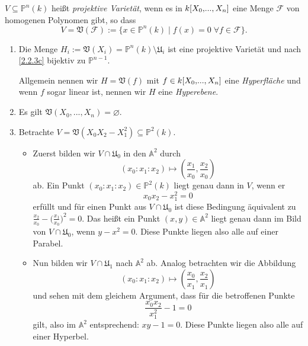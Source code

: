 \documentclass[a4paper,12pt,index=toc]{scrbook}
\theoremstyle{keinenummern} %
\def\A{\mathbb{A}}
\def\V{\mathfrak{V}}
\def\P{\mathbb{P}}
\newcommand{\F}{\mathcal{F}}
\def\U{\mathfrak{U}}
\newcommand{\leer}{\ensuremath{\varnothing}}
\renewcommand{\dotsc}{\ensuremath{\!...}}
\newcommand{\ppolyx}[1][n]{\ensuremath%
  [X_{0},\dotsc,X_{#1}]}
\begin{document}
\begin{dfn}\label{2.3.2}
$V\subseteq\P^{n}(k)$ heißt \emph{projektive Varietät}, wenn es in $k\ppolyx$ eine Menge $\F$ von homogenen Polynomen gibt, so dass
\begin{equation*}V=\V(\F):=\{x\in\P^{n}(k)\mid f(x)=0\;\forall f\in\F\}.\end{equation*}
\end{dfn}

\begin{bsp}\label{2.3.3}\begin{enumerate}
\item Die Menge $H_{i}:=\V(X_{i})=\P^{n}(k)\setminus \U_{i}$ ist eine projektive Varietät und nach \cref{2.2.3c} bijektiv zu $\P^{n-1}$.

Allgemein nennen wir $H=\V(f)$ mit $f\in k\ppolyx$ eine \emph{Hyperfläche} und wenn $f$ sogar linear ist, nennen wir $H$ eine \emph{Hyperebene}.
\item Es gilt $\V(X_{0},\dotsc,X_{n})=\leer$.
\item Betrachte $V=\V(X_{0}X_{2}-X_{1}^{2})\subseteq\P^{2}(k)$.
\begin{itemize}
\item Zuerst bilden wir $V\cap \U_{0}$ in den $\A^{2}$ durch
\begin{equation*}(x_{0}:x_{1}:x_{2})\mapsto\left(\frac{x_{1}}{x_{0}},\frac{x_{2}}{x_{0}}\right)\end{equation*}
ab. Ein Punkt $(x_{0}:x_{1}:x_{2})\in\P^{2}(k)$ liegt genau dann in $V$, wenn er \begin{equation*}x_{0}x_{2}-x_{1}^{2}=0\end{equation*} erfüllt und für einen Punkt aus $V\cap \U_{0}$ ist diese Bedingung äquivalent zu $\frac{x_{2}}{x_{0}}-\bigl(\frac{x_{1}}{x_{0}}\bigr)^{2}=0$. Das heißt ein Punkt $(x,y)\in\A^{2}$ liegt genau dann im Bild von $V\cap \U_{0}$, wenn $y-x^{2}=0$. Diese Punkte liegen also alle auf einer Parabel.
\item Nun bilden wir $V\cap \U_{1}$ nach $\A^{2}$ ab. Analog betrachten wir die Abbildung
\begin{equation*}(x_{0}:x_{1}:x_{2})\mapsto\left(\frac{x_{0}}{x_{1}},\frac{x_{2}}{x_{1}}\right)\end{equation*}
und sehen mit dem gleichem Argument, dass für die betroffenen Punkte \begin{equation*}\frac{x_{0}x_{2}}{x_{1}^{2}}-1=0\end{equation*} gilt, also im $\A^{2}$ entsprechend: $xy-1=0$. Diese Punkte liegen also alle auf einer Hyperbel.
\end{itemize}\end{enumerate}\end{bsp}
\end{document}
